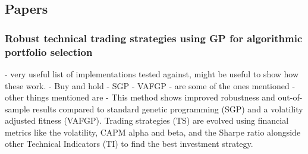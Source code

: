 \documentclass[12pt,a4paper]{article}
\begin{document}
\subsection*{Papers}

\subsubsection*{Robust technical trading strategies using GP for algorithmic portfolio selection}
- very useful list of implementations tested against, might be useful to show how these work.
- Buy and hold
- SGP
- VAFGP
- are some of the ones mentioned
- other things mentioned are
- This method shows improved robustness and out-of-sample results compared to standard genetic programming (SGP) and a volatility adjusted fitness (VAFGP). Trading strategies (TS) are evolved using financial metrics like the volatility, CAPM alpha and beta, and the Sharpe ratio alongside other Technical Indicators (TI) to find the best investment strategy.
\end{document}
